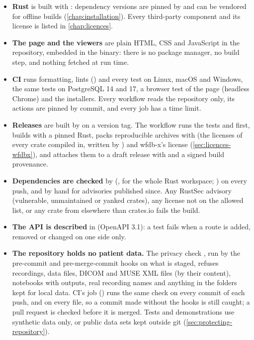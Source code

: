 \begin{itemize}
\item \textbf{Rust} is built with : dependency versions are pinned by
   and can be vendored for offline builds (\cref{chap:installation}). Every
  third-party component and its license is listed in \cref{chap:licences}.
\item \textbf{The page and the viewers} are plain HTML, CSS and JavaScript in the repository,
  embedded in the binary: there is no package manager, no build step, and nothing fetched at run
  time.
\item \textbf{CI} runs formatting, lints () and every test on Linux, macOS and
  Windows, the same tests on PostgreSQL 14 and 17, a browser test of the page (headless Chrome)
  and the installers. Every workflow reads the repository only, its actions
  are pinned by commit, and every job has a time limit.
\item \textbf{Releases} are built by  on a version tag. The
  workflow runs the tests and  first, builds with a pinned Rust, packs
  reproducible archives with  (the licenses of every crate
  compiled in, written by ) and wfdb-x's license (\cref{sec:licences-wfdbx}),
  and attaches them to a draft release with  and a signed
  build provenance.
\item \textbf{Dependencies are checked} by  (, for the whole Rust
  workspace; ) on every push, and by hand for advisories published since. Any RustSec advisory (vulnerable,
  unmaintained or yanked crates), any license not on the allowed list, or any crate from
  elsewhere than crates.io fails the build.
\item \textbf{The API is described} in  (OpenAPI 3.1): a test fails
  when a route is added, removed or changed on one side only.
\item \textbf{The repository holds no patient data.} The privacy check
  , run by the pre-commit and pre-merge-commit hooks on what
  is staged, refuses recordings, data files, DICOM and MUSE XML files (by their content),
  notebooks with outputs, real recording names and anything in the folders kept for local data.
  CI's  job () runs the same check on every
  commit of each push, and on every file, so a commit made without the hooks is still caught; a
  pull request is checked before it is merged. Tests and demonstrations use synthetic data only, or public
  data sets kept outside git (\cref{sec:protecting-repository}).
\end{itemize}


